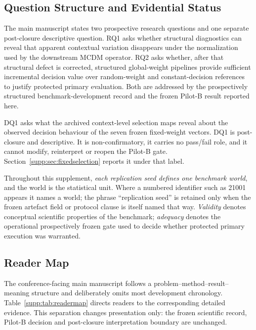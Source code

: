 \documentclass[runningheads,orivec]{llncs}
\begin{document}
\subsection*{Question Structure and Evidential Status}

The main manuscript states two prospective research questions and one separate post-closure
descriptive question. RQ1 asks whether structural diagnostics can reveal that apparent
contextual variation disappears under the normalization used by the downstream MCDM operator.
RQ2 asks whether, after that structural defect is corrected, structured global-weight pipelines
provide sufficient incremental decision value over random-weight and constant-decision
references to justify protected primary evaluation. Both are addressed by the prospectively
structured benchmark-development record and the frozen Pilot-B result reported here.

DQ1 asks what the archived context-level selection maps reveal about the observed decision
behaviour of the seven frozen fixed-weight vectors. DQ1 is post-closure and descriptive. It is
non-confirmatory, it carries no pass/fail role, and it cannot modify, reinterpret or reopen the
Pilot-B gate. Section~\ref{supp:sec:fixedselection} reports it under that label.

Throughout this supplement, \emph{each replication seed defines one benchmark world}, and the
world is the statistical unit. Where a numbered identifier such as 21001 appears it names a
world; the phrase ``replication seed'' is retained only when the frozen artefact field or
protocol clause is itself named that way. \emph{Validity} denotes conceptual scientific
properties of the benchmark; \emph{adequacy} denotes the operational prospectively frozen gate
used to decide whether protected primary execution was warranted.

\subsection*{Reader Map}

The conference-facing main manuscript follows a problem--method--result--meaning structure and
deliberately omits most development chronology. Table~\ref{supp:tab:readermap} directs readers
to the corresponding detailed evidence. This separation changes presentation only: the frozen
scientific record, Pilot-B decision and post-closure interpretation boundary are unchanged.
\end{document}
